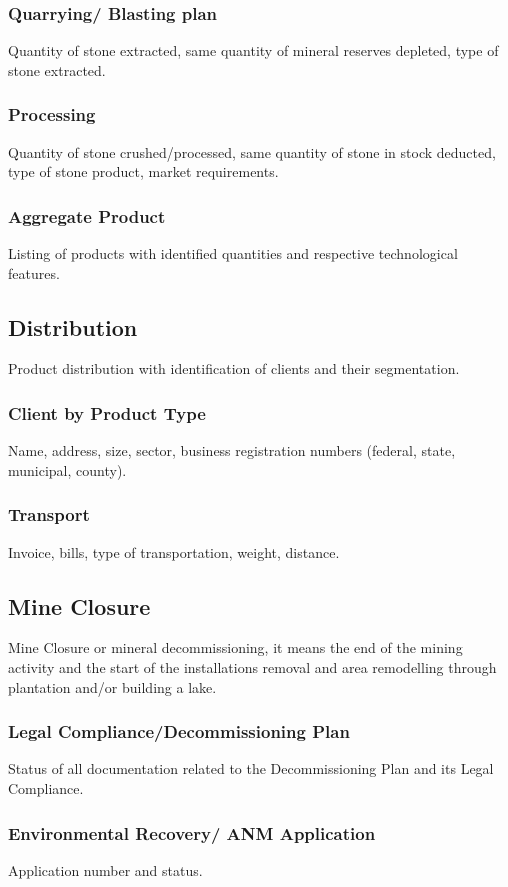 \subsubsection{Quarrying/ Blasting plan}\label{sec:Quarrying}
Quantity of stone extracted, same quantity of mineral reserves depleted, type of stone extracted.

\subsubsection{Processing}\label{sec:Processing}
Quantity of stone crushed/processed, same quantity of stone in stock deducted, type of stone product, market requirements.

\subsubsection{Aggregate Product}\label{sec:AggregateProduct}
Listing of products with identified quantities and respective technological features.

\subsection{Distribution}\label{sec:Distribution}
Product distribution with identification of clients and their segmentation. 

\subsubsection{Client by Product Type}\label{sec:Client}
Name, address, size, sector, business registration numbers (federal, state, municipal, county).

\subsubsection{Transport}\label{sec:Transport}
Invoice, bills, type of transportation, weight, distance.

\subsection{Mine Closure}\label{sec:MineClosure}
Mine Closure or mineral decommissioning, it means the end of the mining activity and the start of the installations removal and area remodelling through plantation and/or building a lake.

\subsubsection{Legal Compliance/Decommissioning Plan}\label{sec:LegalCompliance}
Status of all documentation related to the Decommissioning Plan and its Legal Compliance.

\subsubsection{Environmental Recovery/ ANM Application}\label{sec:EnvironmentalRecovery}
Application number and status.


